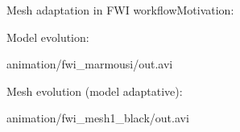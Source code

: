 \begin{frame}[noframenumbering]{Mesh adaptation in FWI workflow}{Motivation:}
  \begin{block}{Model evolution:}
    \begin{center}
            {animation/fwi_marmousi/out.avi}
    \end{center}
  \end{block}

  \begin{block}{Mesh evolution (model adaptative):}
    \begin{center}
            {animation/fwi_mesh1_black/out.avi}
    \end{center}
  \end{block}
\end{frame}


